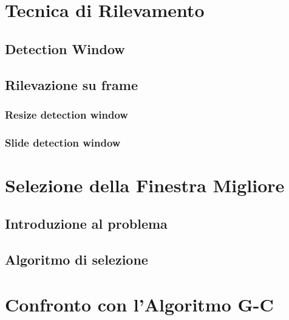     \section{Tecnica di Rilevamento}
    \label{sec:detection_tecnique}
        \subsection{Detection Window}
        \subsection{Rilevazione su frame}
            \subsubsection{Resize detection window}
            \subsubsection{Slide detection window}
    \section{Selezione della Finestra Migliore} %
    \label{sec:best_detection_window}
        \subsection{Introduzione al problema}
        \subsection{Algoritmo di selezione}
    \section{Confronto con l'Algoritmo G-C} %
    \label{sec:gc_algorithm_comparison}